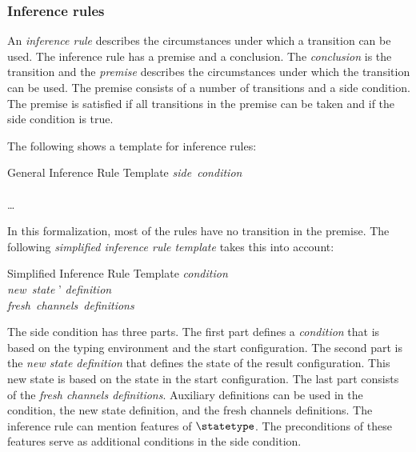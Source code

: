 \subsubsection{Inference rules}
An \emph{inference rule} describes the circumstances under which a transition can be used. The inference rule has a premise and a conclusion. The \emph{conclusion} is the transition and the \emph{premise} describes the circumstances under which the transition can be used. The premise consists of a number of transitions and a side condition. The premise is satisfied if all transitions in the premise can be taken and if the side condition is true.
\begin{fortechnicalreport}
The following shows a template for inference rules:

\singlelineinferencerule
	{General Inference Rule Template}
	{
		\mbox{\it{side condition}} \\
		 \\
		\ldots \\
	}
	{}
	{}

\end{fortechnicalreport}
In this formalization, most of the rules have no transition in the premise. The following \emph{simplified inference rule template} takes this into account:

\singlelineinferencerule
	{Simplified Inference Rule Template}
	{
		\mbox{\it{condition}} \\
		\mbox{\it{new state}} \thinspace \state' \thinspace \mbox{\it{definition}}\\
		\mbox{\it{fresh channels definitions}}
	}
	{}
	{}

The side condition has three parts. The first part defines a \emph{condition} that is based on the typing environment and the start configuration. The second part is the \emph{new state definition} that defines the state of the result configuration. This new state is based on the state in the start configuration. The last part consists of the \emph{fresh channels definitions}. Auxiliary definitions can be used in the condition, the new state definition, and the fresh channels definitions. The inference rule can mention features of $\statetype$. The preconditions of these features serve as additional conditions in the side condition.

